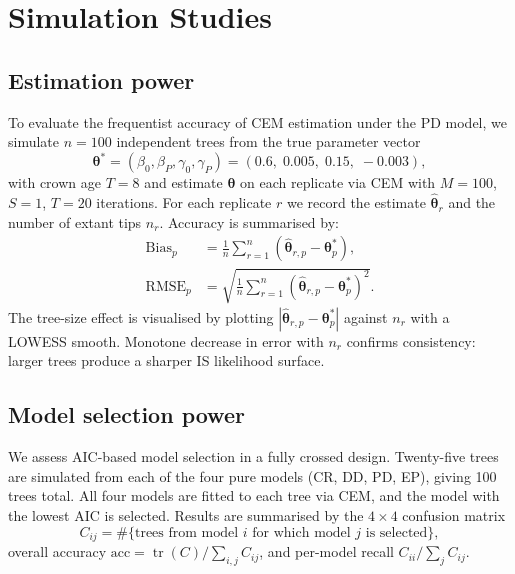 \documentclass[12pt,a4paper]{article}
\newcommand{\pars}{\bm{\theta}}
\begin{document}
\section{Simulation Studies}\label{sec:simstudies}

\subsection{Estimation power}\label{sec:study1}

To evaluate the frequentist accuracy of CEM estimation under the PD model,
we simulate $n = 100$ independent trees from the true parameter vector
\[
  \pars^* = (\beta_0, \beta_P, \gamma_0, \gamma_P)
          = (0.6,\; 0.005,\; 0.15,\; -0.003),
\]
with crown age $T = 8$ and estimate $\pars$ on each replicate via CEM with
$M = 100$, $S = 1$, $T = 20$ iterations. For each replicate $r$ we record
the estimate $\hat{\pars}_r$ and the number of extant tips $n_r$.
Accuracy is summarised by:
\begin{align}
  \text{Bias}_p &= \frac{1}{n}\sum_{r=1}^{n}
    (\hat{\pars}_{r,p} - \pars^*_p),\label{eq:bias}\\
  \text{RMSE}_p &= \sqrt{\frac{1}{n}\sum_{r=1}^{n}
    (\hat{\pars}_{r,p} - \pars^*_p)^2}.\label{eq:rmse}
\end{align}
The tree-size effect is visualised by plotting $|\hat{\pars}_{r,p} - \pars^*_p|$
against $n_r$ with a LOWESS smooth. Monotone decrease in error with $n_r$
confirms consistency: larger trees produce a sharper IS likelihood surface.

\subsection{Model selection power}\label{sec:study2}

We assess AIC-based model selection in a fully crossed design. Twenty-five
trees are simulated from each of the four pure models (CR, DD, PD, EP),
giving 100 trees total. All four models are fitted to each tree via CEM,
and the model with the lowest AIC is selected. Results are summarised by
the $4\times 4$ confusion matrix
\begin{equation}
  C_{ij} = \#\bigl\{\text{trees from model }i
             \text{ for which model }j\text{ is selected}\bigr\},
\end{equation}
overall accuracy $\mathrm{acc} = \operatorname{tr}(C)/\sum_{i,j}C_{ij}$,
and per-model recall $C_{ii}/\sum_j C_{ij}$.
\end{document}
